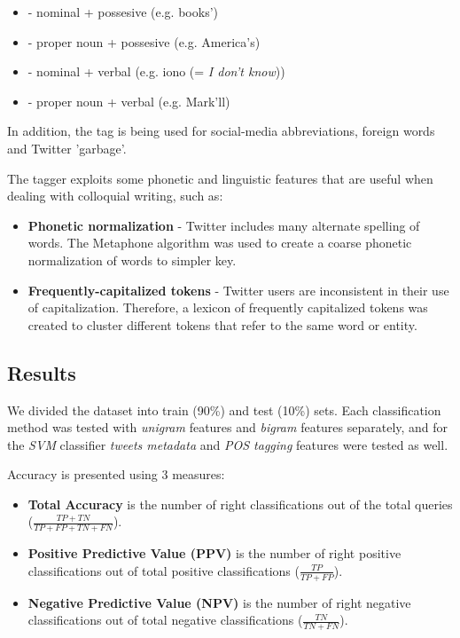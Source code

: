 \documentclass[letterpaper,twocolumn,10pt]{article}
\begin{document}
\begin{itemize}[noitemsep, nolistsep]
	\item \textbf{} - nominal + possesive (e.g. books')
	\item \textbf{} - proper noun + possesive (e.g. America's)
	\item \textbf{} - nominal + verbal (e.g. iono (= \textit{I don't know}))
	\item \textbf{} - proper noun + verbal (e.g. Mark'll)
\end{itemize}

In addition, the tag \textbf{} is being used for social-media abbreviations, foreign words and Twitter 'garbage'.

The tagger exploits some phonetic and linguistic features that are useful when dealing with colloquial writing, such as:

\begin{itemize}[noitemsep, nolistsep]
	\item \textbf{Phonetic normalization} - Twitter includes many alternate spelling of words. The Metaphone algorithm was used to create a coarse phonetic normalization of words to simpler key.
	\item \textbf{Frequently-capitalized tokens} - Twitter users are inconsistent in their use of capitalization. Therefore, a lexicon of frequently capitalized tokens was created to cluster different tokens that refer to the same word or entity.
\end{itemize}


\subsection{Results}
We divided the dataset into train (90\%) and test (10\%) sets. Each classification method was tested with \textit{unigram} features and \textit{bigram} features separately, and for the \textit{SVM} classifier \textit{tweets metadata} and \textit{POS tagging} features were tested as well.

Accuracy is presented using 3 measures:

\begin{itemize}[noitemsep, nolistsep]
	\item \textbf{Total Accuracy} is the number of right classifications out of the total queries ($ \frac{TP + TN}{TP + FP + TN + FN } $).
	\item \textbf{Positive Predictive Value (PPV)} is the number of right positive classifications out of total positive classifications ($ \frac{TP}{TP + FP} $).
	\item \textbf{Negative Predictive Value (NPV)} is the number of right negative classifications out of total negative classifications ($ \frac{TN}{TN + FN} $).
\end{itemize}
\end{document}
